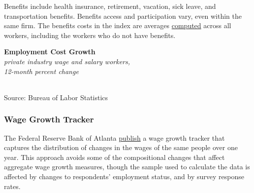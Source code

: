 \documentclass{report}
\makeatletter
\newcommand{\tbllink}[1]{\href{https://raw.githubusercontent.com/bdecon/US-chartbook/master/chartbook/data/#1}{\faTable}}
\newcommand*\short[1]{\expandafter\@gobbletwo\number\numexpr#1\relax}
\newcommand{\absnode}[3]{\node[below right, align=left] at (axis cs: #1,#2) {#3};}
\newcommand{\dateaxisticks}{
		date coordinates in=x, axis line style={draw=none},
		xmax={2022-03-15},
		max space between ticks=40,	    
		xtick={{1990-01-01}, {1992-01-01}, {1994-01-01}, 
			{1996-01-01}, {1998-01-01}, {2000-01-01}, 
			{2002-01-01}, {2004-01-01}, {2006-01-01},
			{2008-01-01}, {2010-01-01}, {2012-01-01}, {2014-01-01},
		    {2016-01-01}, {2018-01-01}, {2020-01-01}, {2022-01-01}, 
		    {2024-01-01}, {2026-01-01}},
		minor xtick={{1989-01-01}, {1991-01-01}, {1993-01-01},
			{1995-01-01}, {1997-01-01}, {1999-01-01}, 
			{2001-01-01}, {2003-01-01}, {2005-01-01}, {2007-01-01},
		    {2009-01-01}, {2011-01-01}, {2013-01-01}, {2015-01-01},
		    {2017-01-01}, {2019-01-01}, {2021-01-01}, {2023-01-01}, 
		    {2025-01-01}, {2027-01-01}},
		enlarge y limits={0.06}, enlarge x limits={0.01},
		}
\newcommand{\bbar}[2]{extra #1 ticks = {{#2}}, extra #1 tick labels = ,
		extra #1 tick style = {grid=major, grid style={thick, black!25}},}
\newcommand{\stdline}[4]{\addplot[very thick, no markers, color=#1] 
		table [x=#2, y=#3, col sep=comma] {#4};	}
\newcommand{\rebars}{
		\fill[color=black!10] (axis cs:{2007-12-01},\pgfkeysvalueof{/pgfplots/ymin}) rectangle 
			(axis cs:{2009-07-01}, \pgfkeysvalueof{/pgfplots/ymax});
		\fill[color=black!10] (axis cs:{2001-03-01},\pgfkeysvalueof{/pgfplots/ymin}) rectangle 
			(axis cs:{2001-11-01}, \pgfkeysvalueof{/pgfplots/ymax});
		\fill[color=black!10] (axis cs:{2020-02-01},\pgfkeysvalueof{/pgfplots/ymin}) rectangle 
			(axis cs:{2020-05-01}, \pgfkeysvalueof{/pgfplots/ymax});}
\makeatother
\begin{document}
{{\begin{minipage}{0.76\textwidth}
Benefits include health insurance, retirement, vacation, sick leave, and transportation benefits. Benefits access and participation vary, even within the same firm. The benefits costs in the index are averages \href{https://www.bls.gov/opub/mlr/cwc/benefit-cost-concepts-and-the-limitations-of-ecec-measurement.pdf}{computed} across all workers, including the workers who do not have benefits. 
\end{minipage}

\begin{minipage}{0.41\textwidth}
\normalsize \textbf{Employment Cost Growth}\\
\footnotesize{\textit{private industry wage and salary workers,}}\\
\footnotesize{\textit{12-month percent change}}\\
\hspace*{-2mm} \\
\footnotesize{Source: Bureau of Labor Statistics} \hfill \tbllink{eci.csv}
\end{minipage} \hspace{6mm} \begin{minipage}{0.3\textwidth}
\small 
\end{minipage}
\newpage
\begin{minipage}{0.76\textwidth}
\subsubsection*{Wage Growth Tracker}
\small The Federal Reserve Bank of Atlanta \href{https://www.frbatlanta.org/chcs/wage-growth-tracker}{publish} a wage growth tracker that captures the distribution of changes in the wages of the same people over one year. This approach avoids some of the compositional changes that affect aggregate wage growth measures, though the sample used to calculate the data is affected by changes to respondents' employment status, and by survey response rates. 


\end{minipage}}}
\end{document}
